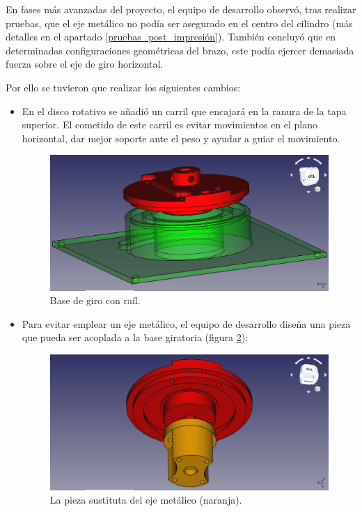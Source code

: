 En fases más avanzadas del proyecto, el equipo de desarrollo observó, tras realizar pruebas, que el eje metálico no podía ser asegurado en el centro del cilindro (más detalles en el apartado \ref{pruebas_post_impresión}). También concluyó que en determinadas configuraciones geométricas del brazo, este podía ejercer demasiada fuerza sobre el eje de giro horizontal.

Por ello se tuvieron que realizar los siguientes cambios:

\begin{itemize}
    \item En el disco rotativo se añadió un carril que encajará en la ranura de la tapa superior. El cometido de este carril es evitar movimientos en el plano horizontal, dar mejor soporte ante el peso y ayudar a guiar el movimiento.

    \begin{figure}[H]
        \centering
        \includegraphics[width=.9\linewidth]{pictures/TapaConBaseRotatoria.png}
        \caption{Base de giro con raíl.}
        \label{fig:base_de_giro_con_rail}
    \end{figure}

    \item Para evitar emplear un eje metálico, el equipo de desarrollo diseña una pieza que pueda ser acoplada a la base giratoria (figura \ref{fig:pieza_sustituta_eje}):

    \begin{figure}[H]
        \centering
        \includegraphics[width=.9\linewidth]{pictures/EjeMadeInElEquipoDeDesarrollo.png}
        \caption{La pieza sustituta del eje metálico (naranja).}
        \label{fig:pieza_sustituta_eje}
    \end{figure}


\end{itemize}
